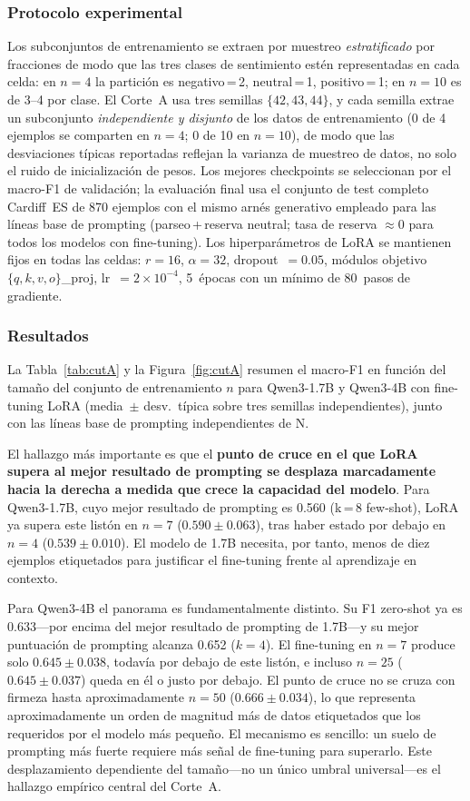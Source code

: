 \documentclass[conference]{IEEEtran}
\begin{document}
\subsubsection*{Protocolo experimental}
Los subconjuntos de entrenamiento se extraen por muestreo \emph{estratificado}
por fracciones de modo que las tres clases de sentimiento estén representadas en
cada celda: en $n=4$ la partición es negativo\,=\,2, neutral\,=\,1,
positivo\,=\,1; en $n=10$ es de 3--4 por clase.
El Corte~A usa tres semillas $\{42,43,44\}$, y cada semilla extrae un
subconjunto \emph{independiente y disjunto} de los datos de entrenamiento
(0 de 4 ejemplos se comparten en $n=4$; 0 de 10 en $n=10$), de modo que las
desviaciones típicas reportadas reflejan la varianza de muestreo de datos, no
solo el ruido de inicialización de pesos.
Los mejores checkpoints se seleccionan por el macro-F1 de validación; la
evaluación final usa el conjunto de test completo Cardiff~ES de 870 ejemplos con
el mismo arnés generativo empleado para las líneas base de prompting
(parseo\,+\,reserva neutral; tasa de reserva $\approx 0$ para todos los modelos
con fine-tuning).
Los hiperparámetros de LoRA se mantienen fijos en todas las celdas: $r=16$,
$\alpha=32$, dropout~$= 0.05$, módulos objetivo $\{q,k,v,o\}$\_proj,
lr~$=2\times10^{-4}$, 5~épocas con un mínimo de 80~pasos de gradiente.

\subsubsection*{Resultados}

La Tabla~\ref{tab:cutA} y la Figura~\ref{fig:cutA} resumen el macro-F1 en función
del tamaño del conjunto de entrenamiento $n$ para Qwen3-1.7B y Qwen3-4B con
fine-tuning LoRA (media~$\pm$ desv.\ típica sobre tres semillas independientes),
junto con las líneas base de prompting independientes de N.

El hallazgo más importante es que el \textbf{punto de cruce en el que LoRA supera
al mejor resultado de prompting se desplaza marcadamente hacia la derecha a
medida que crece la capacidad del modelo}.
Para Qwen3-1.7B, cuyo mejor resultado de prompting es 0.560 (k\,=\,8 few-shot),
LoRA ya supera este listón en $n=7$ ($0.590 \pm 0.063$), tras haber estado por
debajo en $n=4$ ($0.539 \pm 0.010$).
El modelo de 1.7B necesita, por tanto, menos de diez ejemplos etiquetados para
justificar el fine-tuning frente al aprendizaje en contexto.

Para Qwen3-4B el panorama es fundamentalmente distinto.
Su F1 zero-shot ya es 0.633---por encima del mejor resultado de prompting de
1.7B---y su mejor puntuación de prompting alcanza 0.652 ($k=4$).
El fine-tuning en $n=7$ produce solo $0.645 \pm 0.038$, todavía por debajo de
este listón, e incluso $n=25$ ($0.645 \pm 0.037$) queda en él o justo por debajo.
El punto de cruce no se cruza con firmeza hasta aproximadamente $n=50$
($0.666 \pm 0.034$), lo que representa aproximadamente un orden de magnitud más
de datos etiquetados que los requeridos por el modelo más pequeño.
El mecanismo es sencillo: un suelo de prompting más fuerte requiere más señal de
fine-tuning para superarlo.
Este desplazamiento dependiente del tamaño---no un único umbral universal---es el
hallazgo empírico central del Corte~A.
\end{document}
